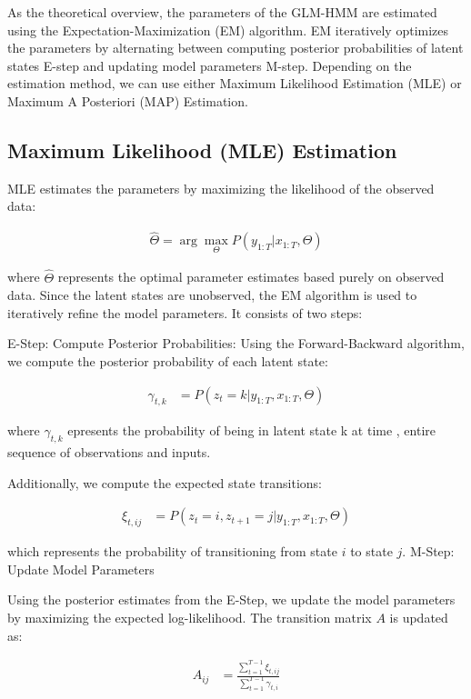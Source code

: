 As the theoretical overview, the parameters of the GLM-HMM are estimated using the Expectation-Maximization (EM) algorithm. EM iteratively optimizes the parameters by alternating between computing posterior probabilities of latent states E-step and updating model parameters M-step. Depending on the estimation method, we can use either Maximum Likelihood Estimation (MLE) or Maximum A Posteriori (MAP) Estimation.
\subsection{Maximum Likelihood (MLE) Estimation }

MLE estimates the parameters by maximizing the likelihood of the observed data:

\begin{align}
\hat{\Theta} = \arg\max_{\Theta} P(y_{1:T} | x_{1:T}, \Theta)
\end{align}

where \( \hat{\Theta} \) represents the optimal parameter estimates based purely on observed data.
Since the latent states  are unobserved, the EM algorithm is used to iteratively refine the model parameters. It consists of two steps: 

E-Step: Compute Posterior Probabilities: Using the Forward-Backward algorithm, we compute the posterior probability of each latent state:

\begin{align}
\gamma_{t,k} &= P(z_t = k | y_{1:T}, x_{1:T}, \Theta)
\end{align}

where $\gamma_{t,k}$ epresents the probability of being in latent state k at time , entire sequence of observations and inputs.

Additionally, we compute the expected state transitions:

\begin{align}
\xi_{t,ij} &= P(z_t = i, z_{t+1} = j | y_{1:T}, x_{1:T}, \Theta)
\end{align}

which represents the probability of transitioning from state \( i \) to state \( j \).
M-Step: Update Model Parameters

Using the posterior estimates from the E-Step, we update the model parameters by maximizing the expected log-likelihood.
The transition matrix \( A \) is updated as:

\begin{align}
A_{ij} &= \frac{\sum_{t=1}^{T-1} \xi_{t,ij}}{\sum_{t=1}^{T-1} \gamma_{t,i}}
\end{align}

